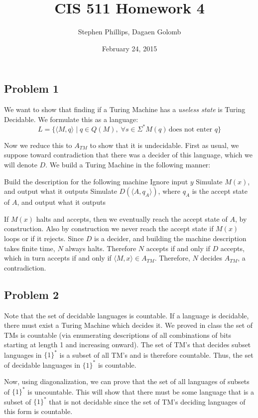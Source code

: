 \documentclass[english]{article}
\title{CIS 511 Homework 4}
\author{Stephen Phillips, Dagaen Golomb}
\date{February 24, 2015}
\begin{document}
\maketitle
\subsection*{Problem 1}
We want to show that finding if a Turing Machine has a \textit{useless state}
is Turing Decidable. We formulate this as a language:
\[ L = \{ \langle M, q \rangle \mid
   q \in Q(M), \;
   \forall s \in \Sigma^* M(q) \, \textrm{does not enter }q \} \]

Now we reduce this to $A_{TM}$ to show that it is undecidable. First as usual, 
we suppose toward contradiction that there was a decider of this language, which
we will denote $D$. We build a Turing Machine in the following manner:
\begin{algorithmic}
\State Build the description for the following machine
		\State Ignore input $y$
		\State Simulate $M(x)$, and output what it outputs
	\EndFunction
\State Simulate $D(\langle A, q_A \rangle)$, where $q_A$ is the accept state
		of $A$, and output what it outputs
\EndFunction 
\end{algorithmic}

If $M(x)$ halts and accepts, then we eventually reach the accept state of $A$,
by construction. Also by construction we never reach the accept state if $M(x)$
loops or if it rejects. Since $D$ is a decider, and building the machine
description takes finite time, $N$ always halts. Therefore $N$ accepts if and
only if $D$ accepts, which in turn accepts if and only if
$\langle M,x \rangle \in A_{TM}$. Therefore, $N$ decides $A_{TM}$, a
contradiction. 

\subsection*{Problem 2}
Note that the set of decidable languages is countable. If a language is decidable,
there must exist a Turing Machine which decides it. We proved in class the set of
TMs is countable (via enumerating descriptions of all combinations of bits starting
at length 1 and increasing onward). The set of TM's that decides subset languages in $\{1\}^*$
is a subset of all TM's and is therefore countable. Thus, the set of decidable languages
in $\{1\}^*$ is countable.

Now, using diagonalization, we can prove that the set of all languages of subsets of $\{1\}^*$
is uncountable. This will show that there must be some language that is a subset of $\{1\}^*$ that
is not decidable since the set of TM's deciding languages of this form is countable.
\end{document}
